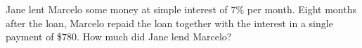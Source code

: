 Jane lent Marcelo some money at simple interest of $7\%$ per month. Eight months after the loan, Marcelo repaid the loan together with the interest in a single payment of \$$780$. How much did Jane lend Marcelo?
